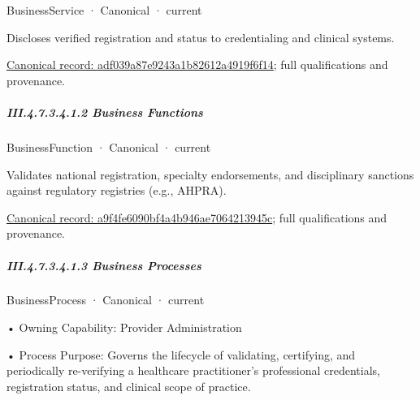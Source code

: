 \label{element:adf039a87e9243a1b82612a4919f6f14}
{\small BusinessService · Canonical · current}\par

Discloses verified registration and status to credentialing and clinical systems.


{\footnotesize \href{../../../../../../../../continuum/business/business-service/adf039a87e9243a1b82612a4919f6f14.md}{Canonical record: adf039a87e9243a1b82612a4919f6f14}; full qualifications and provenance.}\par
\subparagraph*{III.4.7.3.4.1.2 Business Functions}
\label{navigation:III.4.7.3.4.1.2}

\label{navigation:III.4.7.3.4.1.2.1}

\label{element:a9f4fe6090bf4a4b946ae7064213945c}
{\small BusinessFunction · Canonical · current}\par

Validates national registration, specialty endorsements, and disciplinary sanctions against regulatory registries (e.g., AHPRA).


{\footnotesize \href{../../../../../../../../continuum/business/business-function/a9f4fe6090bf4a4b946ae7064213945c.md}{Canonical record: a9f4fe6090bf4a4b946ae7064213945c}; full qualifications and provenance.}\par
\subparagraph*{III.4.7.3.4.1.3 Business Processes}
\label{navigation:III.4.7.3.4.1.3}

\label{navigation:III.4.7.3.4.1.3.1}

\label{element:32a3e1f948474d3aa77ca71bfa515f58}
{\small BusinessProcess · Canonical · current}\par

•
Owning Capability: Provider Administration



•
Process Purpose: Governs the lifecycle of validating, certifying, and periodically re-verifying a healthcare practitioner's professional credentials, registration status, and clinical scope of practice.



